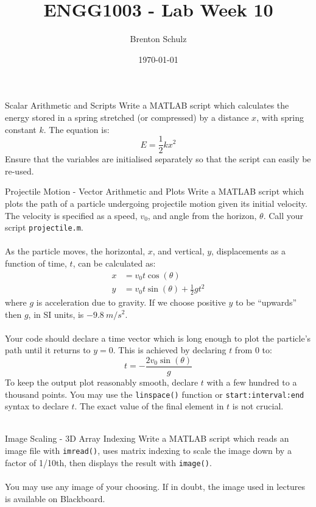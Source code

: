 \documentclass{lab}
\title{ENGG1003 - Lab Week 10}
\author{Brenton Schulz}
\date{\today}
\begin{document}
\maketitle

\begin{task}{Scalar Arithmetic and Scripts}{}
Write a MATLAB script which calculates the energy stored in a spring stretched (or compressed) by a distance $x$, with spring constant $k$. The equation is:
\begin{equation*}
E = \frac{1}{2}k x^2
\end{equation*}
Ensure that the variables are initialised separately so that the script can easily be re-used.
\end{task}

\begin{task}{Projectile Motion - Vector Arithmetic and Plots}{}
Write a MATLAB script which plots the path of a particle undergoing projectile motion given its initial velocity. The velocity is specified as a speed, $v_0$, and angle from the horizon, $\theta$. Call your script \texttt{projectile.m}.
\\~\\
As the particle moves, the horizontal, $x$, and vertical, $y$, displacements as a function of time, $t$, can be calculated as:
\begin{align*}
x &= v_0 t \cos(\theta) \\
y &= v_0 t \sin(\theta) + \frac{1}{2}g t^2
\end{align*}
where $g$ is acceleration due to gravity. If we choose positive $y$ to be ``upwards'' then $g$, in SI units, is $-9.8~{m/s^2}$.
\\~\\
Your code should declare a time vector which is long enough to plot the particle's path until it returns to $y=0$. This is achieved by declaring $t$ from 0 to:
\begin{equation*}
t = -\frac{2 v_0 \sin(\theta)}{g}
\end{equation*}
To keep the output plot reasonably smooth, declare $t$ with a few hundred to a thousand points. You may use the \texttt{linspace()} function or \texttt{start:interval:end} syntax to declare $t$. The exact value of the final element in $t$ is not crucial.
\\~\\
\end{task}

\begin{task}{Image Scaling - 3D Array Indexing}{}
Write a MATLAB script which reads an image file with \texttt{imread()}, uses matrix indexing to scale the image down by a factor of 1/10th, then displays the result with \texttt{image()}.
\\~\\
You may use any image of your choosing. If in doubt, the image used in lectures is available on Blackboard.
\end{task}
\end{document}
